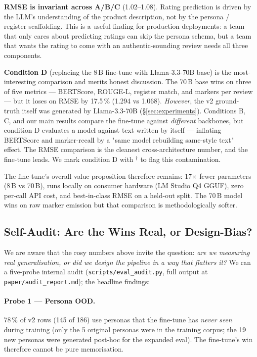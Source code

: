 \documentclass[sigconf,nonacm,balance]{acmart}
\begin{document}
\textbf{RMSE is invariant across A/B/C} (1.02--1.08). Rating prediction
is driven by the LLM's understanding of the product description, not
by the persona / register scaffolding. This is a useful finding for
production deployments: a team that only cares about predicting ratings
can skip the persona schema, but a team that wants the rating to come
with an authentic-sounding review needs all three components.

\textbf{Condition D} (replacing the 8\,B fine-tune with Llama-3.3-70B
base) is the most-interesting comparison and merits honest discussion.
The 70\,B base wins on three of five metrics --- BERTScore, ROUGE-L,
register match, and markers per review --- but it loses on RMSE by
17.5\,\% (1.294 vs 1.068). \emph{However}, the v2 ground-truth itself
was generated by Llama-3.3-70B (\S\ref{sec:experiments}). Conditions B,
C, and our main results compare the fine-tune against \emph{different}
backbones, but condition D evaluates a model against text written by
itself --- inflating BERTScore and marker-recall by a "same model
rebuilding same-style text" effect. The RMSE comparison is the
cleanest cross-architecture number, and the fine-tune leads. We mark
condition D with $^\dagger$ to flag this contamination.

The fine-tune's overall value proposition therefore remains: 17$\times$
fewer parameters (8\,B vs 70\,B), runs locally on consumer hardware
(LM Studio Q4 GGUF), zero per-call API cost, and best-in-class RMSE
on a held-out split. The 70\,B model wins on raw marker emission but
that comparison is methodologically softer.

\subsection{Self-Audit: Are the Wins Real, or Design-Bias?}
\label{sec:audit}

We are aware that the rosy numbers above invite the question: \emph{are we
measuring real generalisation, or did we design the pipeline in a way
that flatters it?} We ran a five-probe internal audit
(\texttt{scripts/eval\_audit.py}, full output at
\texttt{paper/audit\_report.md}); the headline findings:

\paragraph{Probe 1 — Persona OOD.} 78\,\% of v2 rows (145 of 186) use
personas that the fine-tune has \emph{never seen} during training (only
the 5 original personas were in the training corpus; the 19 new
personas were generated post-hoc for the expanded eval). The fine-tune's
win therefore cannot be pure memorisation.
\end{document}
